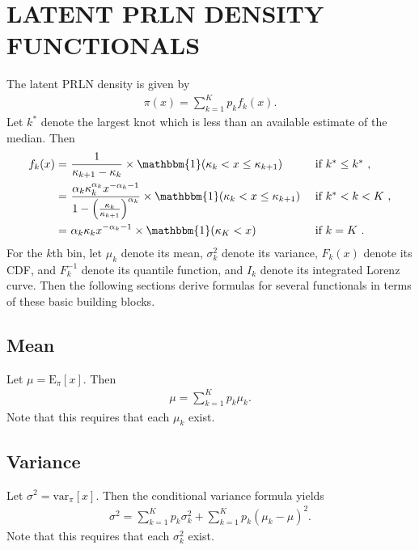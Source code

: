 \documentclass[12pt]{article}
\newcommand{\E}{\mathrm{E}}
\newcommand{\var}{\mathrm{var}}
\begin{document}
\section{LATENT PRLN DENSITY FUNCTIONALS}\label{app:functionals}
\setcounter{table}{0}
The latent PRLN density is given by
\begin{align*}
\pi(x) = \sum_{k=1}^Kp_kf_k(x).
\end{align*}
Let $k^*$ denote the largest knot which is less than an available estimate of the median. Then
\begin{align*}
  f_k(x) = &\  \frac{1}{\kappa_{k+1} - \kappa_k} \times \mathbbm{1}(\kappa_k < x \leq \kappa_{k+1}) && \mbox{ if $k^* \leq k^*$ },\nonumber\\
  = &\  \frac{\alpha_k\kappa_k^{\alpha_k}x^{-\alpha_k - 1}}{1 - \left(\frac{\kappa_k}{\kappa_{k+1}}\right)^{\alpha_k}} \times \mathbbm{1}(\kappa_k < x \leq \kappa_{k+1}) && \mbox{ if $k^* < k < K$ },\nonumber\\
  = &\  \alpha_k\kappa_kx^{-\alpha_k - 1} \times \mathbbm{1}(\kappa_K < x) && \mbox{ if $k = K$ }.
\end{align*}
For the $k$th bin, let $\mu_k$ denote its mean, $\sigma^2_k$ denote its variance, $F_k(x)$ denote its CDF, and $F^{-1}_k$ denote its quantile function, and $I_k$ denote its integrated Lorenz curve. Then the following sections derive formulas for several functionals in terms of these basic building blocks. 
\subsection{Mean}
Let $\mu = \E_\pi[x]$. Then
\begin{align*}
\mu = \sum_{k=1}^Kp_k\mu_k.
\end{align*}
Note that this requires that each $\mu_k$ exist.
\subsection{Variance}
Let $\sigma^2 = \var_{\pi}[x]$. Then the conditional variance formula yields
\begin{align*}
  \sigma^2 = \sum_{k=1}^Kp_k\sigma_k^2 + \sum_{k=1}^Kp_k(\mu_k - \mu)^2.
\end{align*}
Note that this requires that each $\sigma_k^2$ exist.
\end{document}
